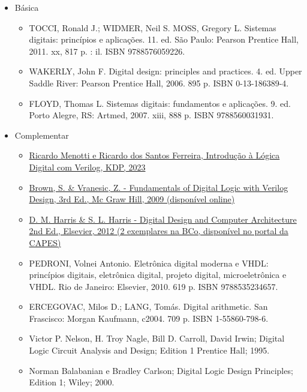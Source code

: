 \begin{frame}[allowframebreaks]{\insertsubsection} 
	\begin{itemize}
		\item Básica
		\begin{itemize}
		    \item TOCCI, Ronald J.; WIDMER, Neil S. MOSS, Gregory L. Sistemas digitais: princípios e aplicações. 11. ed. São Paulo: Pearson Prentice Hall, 2011. xx, 817 p. : il. ISBN 9788576059226.
		    \item WAKERLY, John F. Digital design: principles and practices. 4. ed. Upper Saddle River: Pearson Prentice Hall, 2006. 895 p. ISBN 0-13-186389-4.
		    \item FLOYD, Thomas L. Sistemas digitais: fundamentos e aplicações. 9. ed. Porto Alegre, RS: Artmed, 2007. xiii, 888 p. ISBN 9788560031931.
		\end{itemize}
		\framebreak
		\item Complementar
		\begin{itemize}
                \item \href{https://a.co/d/4j7AOQ5}{Ricardo Menotti e Ricardo dos Santos Ferreira, Introdução à Lógica Digital com Verilog, KDP, 2023}
    	    \item \href{https://www.google.com.br/search?q=filetype\%3Apdf+Fundamentals+of+Digital+Logic+with+Verilog+Design+&oq=filetype\%3Apdf}{Brown, S. \& Vranesic, Z. - Fundamentals of Digital Logic with Verilog Design, 3rd Ed., Mc Graw Hill, 2009 (disponível online)}
        	\item \href{https://www.sciencedirect.com/science/book/9780123944245}{D. M. Harris \& S. L. Harris - Digital Design and Computer Architecture 2nd Ed., Elsevier, 2012 (2 exemplares na BCo, disponível no portal da CAPES)}
        	\framebreak
    		\item PEDRONI, Volnei Antonio. Eletrônica digital moderna e VHDL: princípios digitais, eletrônica digital, projeto digital, microeletrônica e VHDL. Rio de Janeiro: Elsevier, 2010. 619 p. ISBN 9788535234657.
            \item ERCEGOVAC, Milos D.; LANG, Tomás. Digital arithmetic. San Frascisco: Morgan Kaufmann, c2004. 709 p. ISBN 1-55860-798-6.
            \item Victor P. Nelson, H. Troy Nagle, Bill D. Carroll, David Irwin; Digital Logic Circuit Analysis and Design; Edition 1 
            Prentice Hall; 1995. 
            \item Norman Balabanian e Bradley Carlson; Digital Logic Design Principles; Edition 1; Wiley; 2000.
    	\end{itemize}
	\end{itemize}
\end{frame}

